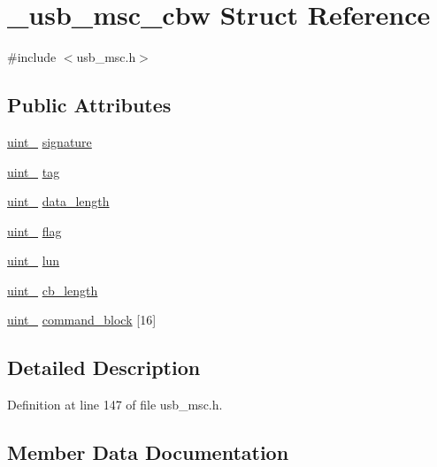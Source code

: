 \hypertarget{struct__usb__msc__cbw}{}\section{\+\_\+usb\+\_\+msc\+\_\+cbw Struct Reference}
\label{struct__usb__msc__cbw}


{\ttfamily \#include $<$usb\+\_\+msc.\+h$>$}

\subsection*{Public Attributes}
\begin{DoxyCompactItemize}
\item 
\hyperlink{types_8h_a5532400b872b4aa84e54335bf458a318}{uint\+\_} \hyperlink{struct__usb__msc__cbw_ac7b913ab1dc1457f782bf30fb455fa73}{signature}
\item 
\hyperlink{types_8h_a5532400b872b4aa84e54335bf458a318}{uint\+\_} \hyperlink{struct__usb__msc__cbw_a859c6eac69d5008a1d0d2a043fcc8c47}{tag}
\item 
\hyperlink{types_8h_a5532400b872b4aa84e54335bf458a318}{uint\+\_} \hyperlink{struct__usb__msc__cbw_ab8c307d0404180da45f915ce5ec71548}{data\+\_\+length}
\item 
\hyperlink{types_8h_ad3209046c23f739a81581c10a4be7d92}{uint\+\_} \hyperlink{struct__usb__msc__cbw_a309f368b2b373120a48b9306e7871286}{flag}
\item 
\hyperlink{types_8h_ad3209046c23f739a81581c10a4be7d92}{uint\+\_} \hyperlink{struct__usb__msc__cbw_a3b28bfb7235c101cf2ffe15b2b99bd5d}{lun}
\item 
\hyperlink{types_8h_ad3209046c23f739a81581c10a4be7d92}{uint\+\_} \hyperlink{struct__usb__msc__cbw_a9572217046b63d946d64b09033d44e37}{cb\+\_\+length}
\item 
\hyperlink{types_8h_ad3209046c23f739a81581c10a4be7d92}{uint\+\_} \hyperlink{struct__usb__msc__cbw_a1479f0dc898b6b2baa289bab24ce45f4}{command\+\_\+block} \mbox{[}16\mbox{]}
\end{DoxyCompactItemize}


\subsection{Detailed Description}


Definition at line 147 of file usb\+\_\+msc.\+h.



\subsection{Member Data Documentation}
